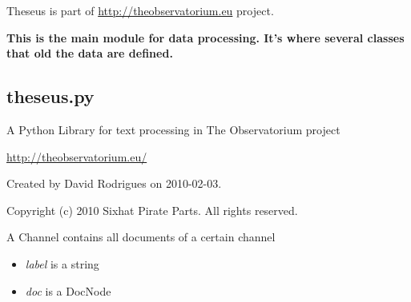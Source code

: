 \documentclass[letterpaper,10pt,english]{sphinxmanual}
\begin{document}
Theseus is part of \href{http://theobservatorium.eu}{http://theobservatorium.eu} project.

\textbf{This is the main module for data processing. It's where several classes that old the data are defined.}
\label{theseus:module-theseus}

\subsection{theseus.py}
\label{theseus:theseus-py}
A Python Library for text processing in The Observatorium project

\href{http://theobservatorium.eu/}{http://theobservatorium.eu/}

Created by David Rodrigues on 2010-02-03.

Copyright (c) 2010 Sixhat Pirate Parts. All rights reserved.

\begin{fulllineitems}
\label{theseus:theseus.Channel}
A Channel contains all documents of a certain channel
\begin{itemize}
\item {} 
\emph{label} is a string

\item {} 
\emph{doc} is a DocNode

\end{itemize}

\end{fulllineitems}

\end{document}

